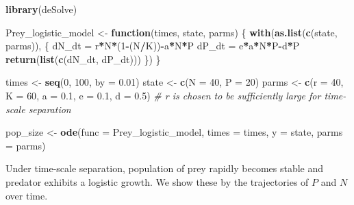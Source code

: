 \documentclass[
]{book}
\newenvironment{Shaded}{\begin{snugshade}}{\end{snugshade}}
\newcommand{\CommentTok}[1]{\textcolor[rgb]{0.56,0.35,0.01}{\textit{#1}}}
\newcommand{\ControlFlowTok}[1]{\textcolor[rgb]{0.13,0.29,0.53}{\textbf{#1}}}
\newcommand{\DataTypeTok}[1]{\textcolor[rgb]{0.13,0.29,0.53}{#1}}
\newcommand{\DecValTok}[1]{\textcolor[rgb]{0.00,0.00,0.81}{#1}}
\newcommand{\FloatTok}[1]{\textcolor[rgb]{0.00,0.00,0.81}{#1}}
\newcommand{\KeywordTok}[1]{\textcolor[rgb]{0.13,0.29,0.53}{\textbf{#1}}}
\newcommand{\NormalTok}[1]{#1}
\newcommand{\OperatorTok}[1]{\textcolor[rgb]{0.81,0.36,0.00}{\textbf{#1}}}
\newcommand{\StringTok}[1]{\textcolor[rgb]{0.31,0.60,0.02}{#1}}
\begin{document}
\begin{Shaded}
\begin{Highlighting}[]
\KeywordTok{library}\NormalTok{(deSolve)}

\NormalTok{Prey_logistic_model <-}\StringTok{ }\ControlFlowTok{function}\NormalTok{(times, state, parms) \{}
  \KeywordTok{with}\NormalTok{(}\KeywordTok{as.list}\NormalTok{(}\KeywordTok{c}\NormalTok{(state, parms)), \{}
\NormalTok{    dN_dt =}\StringTok{ }\NormalTok{r}\OperatorTok{*}\NormalTok{N}\OperatorTok{*}\NormalTok{(}\DecValTok{1}\OperatorTok{-}\NormalTok{(N}\OperatorTok{/}\NormalTok{K))}\OperatorTok{-}\NormalTok{a}\OperatorTok{*}\NormalTok{N}\OperatorTok{*}\NormalTok{P}
\NormalTok{    dP_dt =}\StringTok{ }\NormalTok{e}\OperatorTok{*}\NormalTok{a}\OperatorTok{*}\NormalTok{N}\OperatorTok{*}\NormalTok{P}\OperatorTok{-}\NormalTok{d}\OperatorTok{*}\NormalTok{P}
    \KeywordTok{return}\NormalTok{(}\KeywordTok{list}\NormalTok{(}\KeywordTok{c}\NormalTok{(dN_dt, dP_dt)))}
\NormalTok{  \})}
\NormalTok{\}}

\NormalTok{times <-}\StringTok{ }\KeywordTok{seq}\NormalTok{(}\DecValTok{0}\NormalTok{, }\DecValTok{100}\NormalTok{, }\DataTypeTok{by =} \FloatTok{0.01}\NormalTok{)}
\NormalTok{state <-}\StringTok{ }\KeywordTok{c}\NormalTok{(}\DataTypeTok{N =} \DecValTok{40}\NormalTok{, }\DataTypeTok{P =} \DecValTok{20}\NormalTok{)}
\NormalTok{parms <-}\StringTok{ }\KeywordTok{c}\NormalTok{(}\DataTypeTok{r =} \DecValTok{40}\NormalTok{, }\DataTypeTok{K =} \DecValTok{60}\NormalTok{, }\DataTypeTok{a =} \FloatTok{0.1}\NormalTok{, }\DataTypeTok{e =} \FloatTok{0.1}\NormalTok{, }\DataTypeTok{d =} \FloatTok{0.5}\NormalTok{)  }\CommentTok{# r is chosen to be sufficiently large for time-scale separation}

\NormalTok{pop_size <-}\StringTok{ }\KeywordTok{ode}\NormalTok{(}\DataTypeTok{func =}\NormalTok{ Prey_logistic_model, }\DataTypeTok{times =}\NormalTok{ times, }\DataTypeTok{y =}\NormalTok{ state, }\DataTypeTok{parms =}\NormalTok{ parms)}
\end{Highlighting}
\end{Shaded}

Under time-scale separation, population of prey rapidly becomes stable and predator exhibits a logistic growth. We show these by the trajectories of \(P\) and \(N\) over time.
\end{document}
